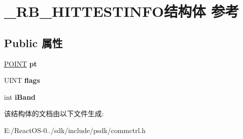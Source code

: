 \hypertarget{struct___r_b___h_i_t_t_e_s_t_i_n_f_o}{}\section{\+\_\+\+R\+B\+\_\+\+H\+I\+T\+T\+E\+S\+T\+I\+N\+F\+O结构体 参考}
\label{struct___r_b___h_i_t_t_e_s_t_i_n_f_o}
\subsection*{Public 属性}
\begin{DoxyCompactItemize}
\item 
\mbox{\label{struct___r_b___h_i_t_t_e_s_t_i_n_f_o_a3c64ff4a9b8783b52afdd78aa24cd290}} 
\hyperlink{structtag_p_o_i_n_t}{P\+O\+I\+NT} {\bfseries pt}
\item 
\mbox{\label{struct___r_b___h_i_t_t_e_s_t_i_n_f_o_ab1e6eb06a087cb7b5925122e6e1d93fc}} 
U\+I\+NT {\bfseries flags}
\item 
\mbox{\label{struct___r_b___h_i_t_t_e_s_t_i_n_f_o_a5d527c12dbda439da8ba9397493c4358}} 
int {\bfseries i\+Band}
\end{DoxyCompactItemize}


该结构体的文档由以下文件生成\+:\begin{DoxyCompactItemize}
\item 
E\+:/\+React\+O\+S-\/0../sdk/include/psdk/commctrl.\+h\end{DoxyCompactItemize}
